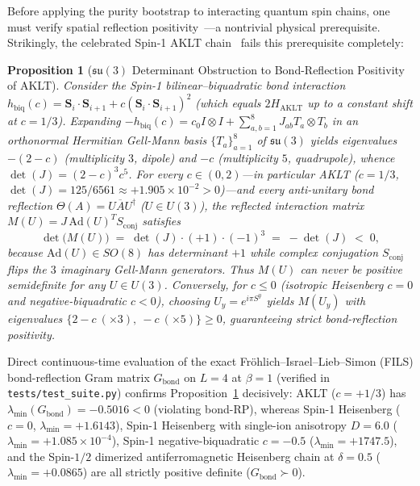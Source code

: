 \documentclass[11pt,a4paper]{article}
\newtheorem{proposition}[theorem]{Proposition}
\theoremstyle{definition}
\begin{document}
Before applying the purity bootstrap to interacting quantum spin chains, one must verify spatial reflection positivity~\cite{Frohlich1978Reflection}—a nontrivial physical prerequisite. Strikingly, the celebrated Spin-1 AKLT chain~\cite{Affleck1987AKLT} fails this prerequisite completely:

\begin{proposition}[$\mathfrak{su}(3)$ Determinant Obstruction to Bond-Reflection Positivity of AKLT]
\label{prop:aklt_nogo}
Consider the Spin-1 bilinear--biquadratic bond interaction $h_{\mathrm{biq}}(c) = \mathbf{S}_i\cdot\mathbf{S}_{i+1} + c(\mathbf{S}_i\cdot\mathbf{S}_{i+1})^2$ (which equals $2 H_{\mathrm{AKLT}}$ up to a constant shift at $c = 1/3$). Expanding $-h_{\mathrm{biq}}(c) = c_0 I\otimes I + \sum_{a,b=1}^8 J_{ab} T_a \otimes T_b$ in an orthonormal Hermitian Gell-Mann basis $\{T_a\}_{a=1}^8$ of $\mathfrak{su}(3)$ yields eigenvalues $-(2-c)$ (multiplicity $3$, dipole) and $-c$ (multiplicity $5$, quadrupole), whence $\det(J) = (2-c)^3 c^5$. For \emph{every} $c \in (0, 2)$—in particular AKLT ($c = 1/3$, $\det(J) = 125/6561 \approx +1.905 \times 10^{-2} > 0$)—and \emph{every} anti-unitary bond reflection $\Theta(A) = U \overline{A} U^\dagger$ ($U \in U(3)$), the reflected interaction matrix $M(U) = J\,\mathrm{Ad}(U)^T S_{\mathrm{conj}}$ satisfies
\[
  \det\bigl(M(U)\bigr) \;=\; \det(J)\cdot (+1)\cdot (-1)^3 \;=\; -\det(J) \;<\; 0,
\]
because $\mathrm{Ad}(U) \in SO(8)$ has determinant $+1$ while complex conjugation $S_{\mathrm{conj}}$ flips the $3$ imaginary Gell-Mann generators. Thus $M(U)$ can never be positive semidefinite for any $U \in U(3)$. Conversely, for $c \le 0$ (isotropic Heisenberg $c=0$ and negative-biquadratic $c<0$), choosing $U_y = e^{i\pi S^y}$ yields $M(U_y)$ with eigenvalues $\{2-c\ (\times 3),\ -c\ (\times 5)\} \ge 0$, guaranteeing strict bond-reflection positivity.
\end{proposition}

Direct continuous-time evaluation of the exact Fr\"ohlich--Israel--Lieb--Simon (FILS) bond-reflection Gram matrix $G_{\mathrm{bond}}$ on $L = 4$ at $\beta = 1$ (verified in \texttt{tests/test\_suite.py}) confirms Proposition~\ref{prop:aklt_nogo} decisively: AKLT ($c = +1/3$) has $\lambda_{\min}(G_{\mathrm{bond}}) = -0.5016 < 0$ (violating bond-RP), whereas Spin-1 Heisenberg ($c=0$, $\lambda_{\min} = +1.6143$), Spin-1 Heisenberg with single-ion anisotropy $D = 6.0$ ($\lambda_{\min} = +1.085 \times 10^{-4}$), Spin-1 negative-biquadratic $c = -0.5$ ($\lambda_{\min} = +1747.5$), and the Spin-$1/2$ dimerized antiferromagnetic Heisenberg chain at $\delta = 0.5$ ($\lambda_{\min} = +0.0865$) are all strictly positive definite ($G_{\mathrm{bond}} \succ 0$).
\end{document}
